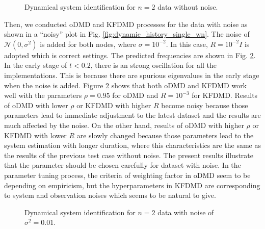 \documentclass[aip,graphicx]{revtex4-1}
\begin{document}
\begin{figure}
	\caption{Dynamical system identification for $n=2$ data without noise.}
	\label{fig:freq_history_wonoise_single}
\end{figure}


Then, we conducted oDMD and KFDMD processes for the data with noise as shown in a ``noisy'' plot in Fig. \ref{fig:dynamic_history_single_wn}. The noise of $\mathcal{N}(0,\sigma^2)$ is added for both nodes, where $\sigma=10^{-2}$. In this case, $R=10^{-2}I$ is adopted which is correct settings. The predicted frequencies are shown in Fig. \ref{fig:freq_history_wnoise_single}.  In the early stage of $t<0.2$, there is an strong oscillation for all the implementations. This is because there are spurious eigenvalues in the early stage when the noise is added. Figure \ref{fig:freq_history_wnoise_single} shows that both oDMD and KFDMD work well with the parameters $\rho=0.95$ for oDMD and $R=10^{-3}$ for KFDMD.  Results of oDMD with lower $\rho$ or KFDMD with higher $R$ become noisy because those parameters lead to immediate adjustment to the latest dataset and the results are much affected by the noise. On the other hand, results of oDMD with higher $\rho$ or KFDMD with lower $R$ are slowly changed because those parameters lead to the system estimation with longer duration, where this characteristics are the same as the results of the previous test case without noise. The present results illustrate that the parameter should be chosen carefully for dataset with noise. In the parameter tuning process, the criteria of weighting factor in oDMD seem to be depending on empiricism, but the hyperparameters in KFDMD are corresponding to system and observation noises which seems to be natural to give. 

\begin{figure}
	\caption{Dynamical system identification for $n=2$ data with noise of $\sigma^2=0.01$.}
	\label{fig:freq_history_wnoise_single}
\end{figure}
\end{document}
